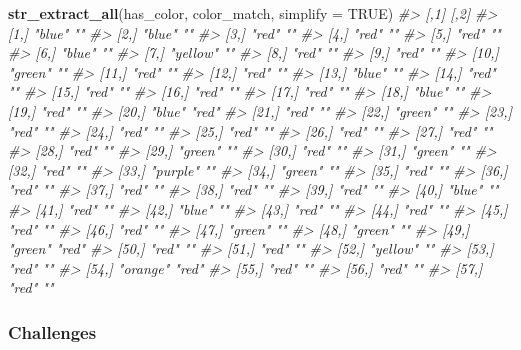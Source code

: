 \documentclass[]{book}
\newenvironment{Shaded}{\begin{snugshade}}{\end{snugshade}}
\newcommand{\KeywordTok}[1]{\textcolor[rgb]{0.13,0.29,0.53}{\textbf{#1}}}
\newcommand{\DataTypeTok}[1]{\textcolor[rgb]{0.13,0.29,0.53}{#1}}
\newcommand{\CommentTok}[1]{\textcolor[rgb]{0.56,0.35,0.01}{\textit{#1}}}
\newcommand{\OtherTok}[1]{\textcolor[rgb]{0.56,0.35,0.01}{#1}}
\newcommand{\NormalTok}[1]{#1}
\begin{document}
\begin{Shaded}
\begin{Highlighting}[]
\KeywordTok{str_extract_all}\NormalTok{(has_color, color_match, }\DataTypeTok{simplify =} \OtherTok{TRUE}\NormalTok{)}
\CommentTok{#>       [,1]     [,2] }
\CommentTok{#>  [1,] "blue"   ""   }
\CommentTok{#>  [2,] "blue"   ""   }
\CommentTok{#>  [3,] "red"    ""   }
\CommentTok{#>  [4,] "red"    ""   }
\CommentTok{#>  [5,] "red"    ""   }
\CommentTok{#>  [6,] "blue"   ""   }
\CommentTok{#>  [7,] "yellow" ""   }
\CommentTok{#>  [8,] "red"    ""   }
\CommentTok{#>  [9,] "red"    ""   }
\CommentTok{#> [10,] "green"  ""   }
\CommentTok{#> [11,] "red"    ""   }
\CommentTok{#> [12,] "red"    ""   }
\CommentTok{#> [13,] "blue"   ""   }
\CommentTok{#> [14,] "red"    ""   }
\CommentTok{#> [15,] "red"    ""   }
\CommentTok{#> [16,] "red"    ""   }
\CommentTok{#> [17,] "red"    ""   }
\CommentTok{#> [18,] "blue"   ""   }
\CommentTok{#> [19,] "red"    ""   }
\CommentTok{#> [20,] "blue"   "red"}
\CommentTok{#> [21,] "red"    ""   }
\CommentTok{#> [22,] "green"  ""   }
\CommentTok{#> [23,] "red"    ""   }
\CommentTok{#> [24,] "red"    ""   }
\CommentTok{#> [25,] "red"    ""   }
\CommentTok{#> [26,] "red"    ""   }
\CommentTok{#> [27,] "red"    ""   }
\CommentTok{#> [28,] "red"    ""   }
\CommentTok{#> [29,] "green"  ""   }
\CommentTok{#> [30,] "red"    ""   }
\CommentTok{#> [31,] "green"  ""   }
\CommentTok{#> [32,] "red"    ""   }
\CommentTok{#> [33,] "purple" ""   }
\CommentTok{#> [34,] "green"  ""   }
\CommentTok{#> [35,] "red"    ""   }
\CommentTok{#> [36,] "red"    ""   }
\CommentTok{#> [37,] "red"    ""   }
\CommentTok{#> [38,] "red"    ""   }
\CommentTok{#> [39,] "red"    ""   }
\CommentTok{#> [40,] "blue"   ""   }
\CommentTok{#> [41,] "red"    ""   }
\CommentTok{#> [42,] "blue"   ""   }
\CommentTok{#> [43,] "red"    ""   }
\CommentTok{#> [44,] "red"    ""   }
\CommentTok{#> [45,] "red"    ""   }
\CommentTok{#> [46,] "red"    ""   }
\CommentTok{#> [47,] "green"  ""   }
\CommentTok{#> [48,] "green"  ""   }
\CommentTok{#> [49,] "green"  "red"}
\CommentTok{#> [50,] "red"    ""   }
\CommentTok{#> [51,] "red"    ""   }
\CommentTok{#> [52,] "yellow" ""   }
\CommentTok{#> [53,] "red"    ""   }
\CommentTok{#> [54,] "orange" "red"}
\CommentTok{#> [55,] "red"    ""   }
\CommentTok{#> [56,] "red"    ""   }
\CommentTok{#> [57,] "red"    ""}
\end{Highlighting}
\end{Shaded}

\subsubsection*{Challenges}\label{challenges-18}
\end{document}
